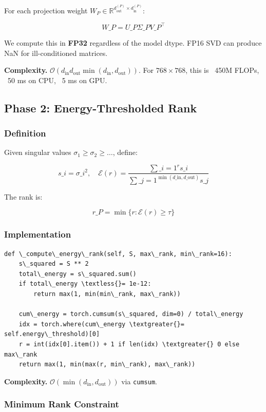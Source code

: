 For each projection weight $W_P \in \mathbb{R}^{d_\text{out}^{(P)} \times d_\text{in}^{(P)}}$:

\[
W\_P = U\_P \Sigma\_P V\_P^\top
\tag{4.1}
\]

We compute this in \textbf{FP32} regardless of the model dtype. FP16 SVD can 
produce NaN for ill-conditioned matrices.

\textbf{Complexity.} $\mathcal{O}(d_\text{in} d_\text{out} \min(d_\text{in}, d_\text{out}))$. 
For $768 \times 768$, this is ~450M FLOPs, ~50 ms on CPU, ~5 ms on GPU.

\subsection{Phase 2: Energy-Thresholded Rank}

\subsubsection{Definition}

Given singular values $\sigma_1 \geq \sigma_2 \geq \dots$, define:

\[
s\_i = \sigma\_i^2, \quad \mathcal{E}(r) = \frac{\sum\_{i=1}^{r} s\_i}{\sum\_{j=1}^{\min(d\_\text{in}, d\_\text{out})} s\_j}
\tag{4.2}
\]

The rank is:

\[
r\_P = \min\{r : \mathcal{E}(r) \geq \tau\}
\tag{4.3}
\]

\subsubsection{Implementation}

\begin{lstlisting}
def \_compute\_energy\_rank(self, S, max\_rank, min\_rank=16):
    s\_squared = S ** 2
    total\_energy = s\_squared.sum()
    if total\_energy \textless{}= 1e-12:
        return max(1, min(min\_rank, max\_rank))
    
    cum\_energy = torch.cumsum(s\_squared, dim=0) / total\_energy
    idx = torch.where(cum\_energy \textgreater{}= self.energy\_threshold)[0]
    r = int(idx[0].item()) + 1 if len(idx) \textgreater{} 0 else max\_rank
    return max(1, min(max(r, min\_rank), max\_rank))
\end{lstlisting}

\textbf{Complexity.} $\mathcal{O}(\min(d_\text{in}, d_\text{out}))$ via \texttt{cumsum}.

\subsubsection{Minimum Rank Constraint}

